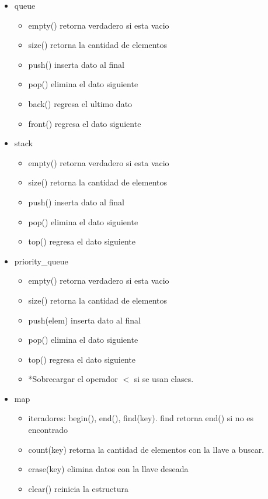 \documentclass[a4paper,spanish,10pt]{article}
\begin{document}
	\begin{multicols}{2}
	\begin{itemize}
		\item{ queue
			\begin{itemize}
				\item empty() retorna verdadero si esta vacio
				\item size() retorna la cantidad de elementos
				\item push() inserta dato al final
				\item pop() elimina el dato siguiente
				\item back() regresa el ultimo dato
				\item front() regresa el dato siguiente
			\end{itemize}
		}
		\item{ stack
			\begin{itemize}
				\item empty() retorna verdadero si esta vacio
				\item size() retorna la cantidad de elementos
				\item push() inserta dato al final
				\item pop() elimina el dato siguiente
				\item top() regresa el dato siguiente
			\end{itemize}
		}
		\item{ priority\_queue
			\begin{itemize}
				\item empty() retorna verdadero si esta vacio
				\item size() retorna la cantidad de elementos
				\item push(elem) inserta dato al final
				\item pop() elimina el dato siguiente
				\item top() regresa el dato siguiente
				\item *Sobrecargar el operador $<$ si se usan clases. 
			\end{itemize}
		}
		\item{ map
			\begin{itemize}
				\item iteradores: begin(), end(), find(key). find retorna end() si no es encontrado
				\item count(key) retorna la cantidad de elementos con la llave a buscar. 
				\item erase(key) elimina datos con la llave deseada
				\item clear() reinicia la estructura

\end{itemize}}
\end{itemize}
\end{multicols}
\end{document}
